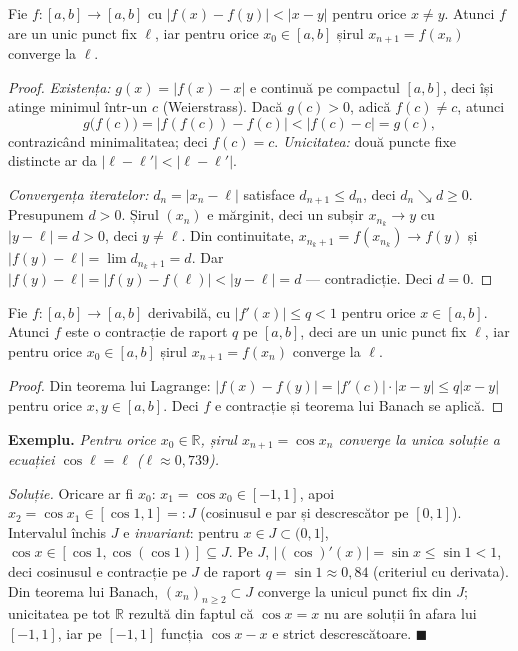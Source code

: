 \begin{teorema}
Fie $f:[a,b]\to[a,b]$ cu $|f(x)-f(y)|<|x-y|$ pentru orice $x\neq y$. Atunci $f$ are un unic punct fix $\ell$, iar pentru orice $x_0\in[a,b]$ șirul $x_{n+1}=f(x_n)$ converge la $\ell$.
\end{teorema}
\begin{proof}
\emph{Existența:} $g(x)=|f(x)-x|$ e continuă pe compactul $[a,b]$, deci își atinge minimul într-un $c$ (Weierstrass). Dacă $g(c)>0$, adică $f(c)\neq c$, atunci
\[
g\big(f(c)\big)=|f(f(c))-f(c)|<|f(c)-c|=g(c),
\]
contrazicând minimalitatea; deci $f(c)=c$. \emph{Unicitatea:} două puncte fixe distincte ar da $|\ell-\ell'|<|\ell-\ell'|$.

\emph{Convergența iteratelor:} $d_n=|x_n-\ell|$ satisface $d_{n+1}\le d_n$, deci $d_n\searrow d\ge0$. Presupunem $d>0$. Șirul $(x_n)$ e mărginit, deci un subșir $x_{n_k}\to y$ cu $|y-\ell|=d>0$, deci $y\neq\ell$. Din continuitate, $x_{n_k+1}=f(x_{n_k})\to f(y)$ și $|f(y)-\ell|=\lim d_{n_k+1}=d$. Dar $|f(y)-\ell|=|f(y)-f(\ell)|<|y-\ell|=d$ --- contradicție. Deci $d=0$.
\end{proof}

\begin{corolar}\label{cor:contractie-derivata}
Fie $f:[a,b]\to[a,b]$ derivabilă, cu $|f'(x)|\le q<1$ pentru orice $x\in[a,b]$. Atunci $f$ este o contracție de raport $q$ pe $[a,b]$, deci are un unic punct fix $\ell$, iar pentru orice $x_0\in[a,b]$ șirul $x_{n+1}=f(x_n)$ converge la $\ell$.
\end{corolar}
\begin{proof}
Din teorema lui Lagrange: $|f(x)-f(y)|=|f'(c)|\cdot|x-y|\le q|x-y|$ pentru orice $x,y\in[a,b]$. Deci $f$ e contracție și teorema lui Banach se aplică.
\end{proof}

\textbf{Exemplu.} \emph{Pentru orice $x_0\in\mathbb{R}$, șirul $x_{n+1}=\cos x_n$ converge la unica soluție a ecuației $\cos\ell=\ell$ ($\ell\approx0{,}739$).}

\emph{Soluție.} Oricare ar fi $x_0$: $x_1=\cos x_0\in[-1,1]$, apoi $x_2=\cos x_1\in[\cos1,1]=:J$ (cosinusul e par și descrescător pe $[0,1]$). Intervalul închis $J$ e \emph{invariant}: pentru $x\in J\subset(0,1]$, $\cos x\in[\cos1,\cos(\cos1)]\subseteq J$. Pe $J$, $|(\cos)'(x)|=\sin x\le\sin1<1$, deci cosinusul e contracție pe $J$ de raport $q=\sin1\approx0{,}84$ (criteriul cu derivata). Din teorema lui Banach, $(x_n)_{n\ge2}\subset J$ converge la unicul punct fix din $J$; unicitatea pe tot $\mathbb{R}$ rezultă din faptul că $\cos x=x$ nu are soluții în afara lui $[-1,1]$, iar pe $[-1,1]$ funcția $\cos x-x$ e strict descrescătoare. $\blacksquare$

